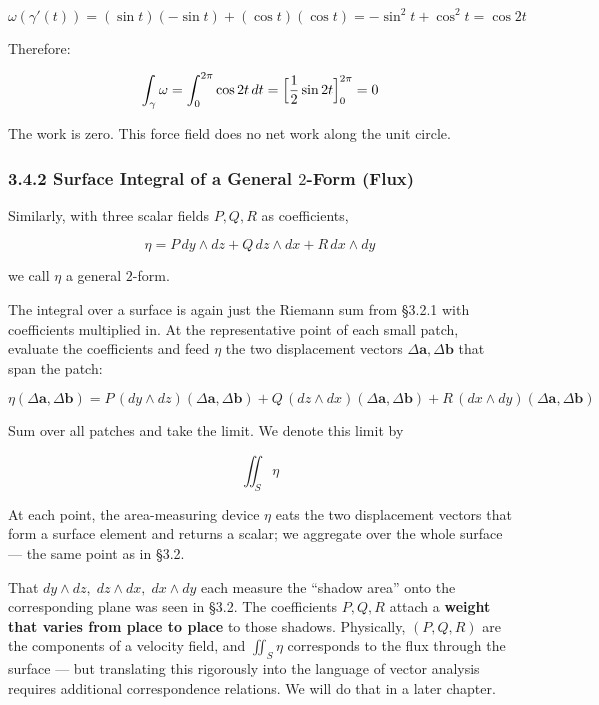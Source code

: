 \documentclass[a4paper,12pt,openany]{book}
\begin{document}
\[\omega(\gamma'(t)) = (\sin t)(-\sin t) + (\cos t)(\cos t) = -\sin^2\!t + \cos^2\!t = \cos 2t\]

Therefore:

\[\int_\gamma \omega = \int_0^{2\pi} \cos 2t\,dt = \Bigl[\frac{1}{2}\sin 2t\Bigr]_0^{2\pi} = 0\]

The work is zero. This force field does no net work along the unit
circle.

\hypertarget{surface-integral-of-a-general-2-form-flux}{%
\subsubsection{\texorpdfstring{3.4.2 Surface Integral of a General
\(2\)-Form
(Flux)}{3.4.2 Surface Integral of a General 2-Form (Flux)}}\label{surface-integral-of-a-general-2-form-flux}}

Similarly, with three scalar fields \(P,Q,R\) as coefficients,

\[
\eta = P\,dy \wedge dz + Q\,dz \wedge dx + R\,dx \wedge dy
\]

we call \(\eta\) a general \(2\)-form.

The integral over a surface is again just the Riemann sum from §3.2.1
with coefficients multiplied in. At the representative point of each
small patch, evaluate the coefficients and feed \(\eta\) the two
displacement vectors \(\Delta\mathbf{a},\Delta\mathbf{b}\) that span the
patch:

\[\eta(\Delta\mathbf{a},\Delta\mathbf{b})
= P\,(dy \wedge dz)(\Delta\mathbf{a},\Delta\mathbf{b})
{}+ Q\,(dz \wedge dx)(\Delta\mathbf{a},\Delta\mathbf{b})
{}+ R\,(dx \wedge dy)(\Delta\mathbf{a},\Delta\mathbf{b})\]

Sum over all patches and take the limit. We denote this limit by

\[\iint_S \eta\]

At each point, the area-measuring device \(\eta\) eats the two
displacement vectors that form a surface element and returns a scalar;
we aggregate over the whole surface — the same point as in §3.2.

That \(dy \wedge dz,\; dz \wedge dx,\; dx \wedge dy\) each measure the
``shadow area'' onto the corresponding plane was seen in §3.2. The
coefficients \(P, Q, R\) attach a
\textbf{weight that varies from place to place} to those shadows.
Physically, \((P, Q, R)\) are the components of a velocity field, and
\(\iint_S \eta\) corresponds to the flux through the surface — but
translating this rigorously into the language of vector analysis
requires additional correspondence relations. We will do that in a later
chapter.
\end{document}
